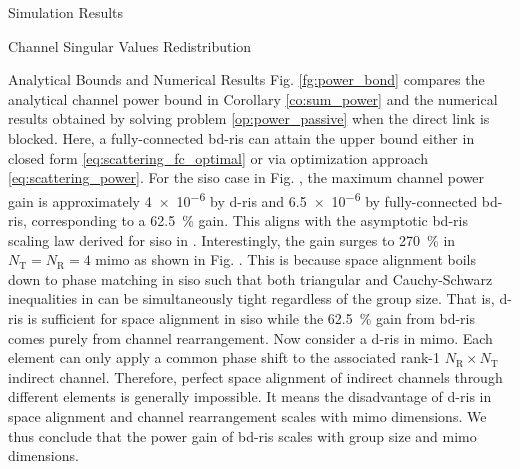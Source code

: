 \documentclass[journal]{IEEEtran}
\begin{document}
\begin{section}{Simulation Results}
\begin{subsection}{Channel Singular Values Redistribution}
\begin{subsubsection}{Analytical Bounds and Numerical Results}
			Fig. \ref{fg:power_bond} compares the analytical channel power bound in Corollary \ref{co:sum_power} and the numerical results obtained by solving problem \eqref{op:power_passive} when the direct link is blocked.
			Here, a fully-connected \gls{bd}-\gls{ris} can attain the upper bound either in closed form \eqref{eq:scattering_fc_optimal} or via optimization approach \eqref{eq:scattering_power}.
			For the \gls{siso} case in Fig. , the maximum channel power gain is approximately \num{4e-6} by \gls{d}-\gls{ris} and \num{6.5e-6} by fully-connected \gls{bd}-\gls{ris}, corresponding to a \qty{62.5}{\percent} gain.
			This aligns with the asymptotic \gls{bd}-\gls{ris} scaling law derived for \gls{siso} in \cite{Shen2020a}.
			Interestingly, the gain surges to \qty{270}{\percent} in $N_\mathrm{T}=N_\mathrm{R}=4$ \gls{mimo} as shown in Fig. .
			This is because space alignment boils down to phase matching in \gls{siso} such that both triangular and Cauchy-Schwarz inequalities in \cite[(50)]{Shen2020a} can be simultaneously tight regardless of the group size.
			That is, \gls{d}-\gls{ris} is sufficient for space alignment in \gls{siso} while the \qty{62.5}{\percent} gain from \gls{bd}-\gls{ris} comes purely from channel rearrangement.
			Now consider a \gls{d}-\gls{ris} in \gls{mimo}.
			Each element can only apply a common phase shift to the associated rank-1 $N_\mathrm{R} \times N_\mathrm{T}$ indirect channel.
			Therefore, perfect space alignment of indirect channels through different elements is generally impossible.
			It means the disadvantage of \gls{d}-\gls{ris} in space alignment and channel rearrangement scales with \gls{mimo} dimensions.
			We thus conclude that the power gain of \gls{bd}-\gls{ris} scales with group size and \gls{mimo} dimensions.
		\end{subsubsection}


\end{subsection}
\end{section}
\end{document}
